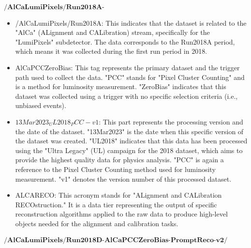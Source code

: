 $\textbf{/AlCaLumiPixels/Run2018A-AlCaPCCZeroBias-13Mar2023\_UL2018\_PCC-v1/ALCARECO}$

\begin{itemize}

\item /AlCaLumiPixels/Run2018A:
This indicates that the dataset is related to the "AlCa" (ALignment and CALibration) stream, specifically for the "LumiPixels" subdetector. The data corresponds to the Run2018A period, which means it was collected during the first run period in 2018.

\item AlCaPCCZeroBias:
This tag represents the primary dataset and the trigger path used to collect the data. "PCC" stands for "Pixel Cluster Counting" and is a method for luminosity measurement. "ZeroBias" indicates that this dataset was collected using a trigger with no specific selection criteria (i.e., unbiased events).

\item $13Mar2023_UL2018_PCC-v1$:
This part represents the processing version and the date of the dataset. "13Mar2023" is the date when this specific version of the dataset was created. "UL2018" indicates that this data has been processed using the "Ultra Legacy" (UL) campaign for the 2018 dataset, which aims to provide the highest quality data for physics analysis. "PCC" is again a reference to the Pixel Cluster Counting method used for luminosity measurement. "v1" denotes the version number of this processed dataset.

\item ALCARECO:
This acronym stands for "ALignment and CALibration RECOstruction." It is a data tier representing the output of specific reconstruction algorithms applied to the raw data to produce high-level objects needed for the alignment and calibration tasks.


\end{itemize}



$\textbf{/AlCaLumiPixels/Run2018D-AlCaPCCZeroBias-PromptReco-v2/ALCARECO}$

